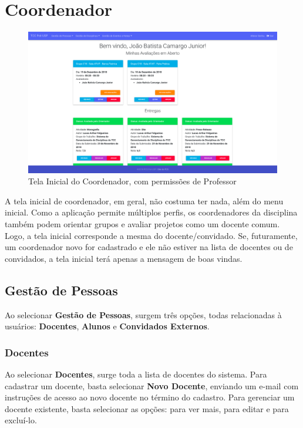 \section{Coordenador}
\begin{figure}[H]
    \centering
    \includegraphics[scale=0.3]{imagens/tela_inicial_coordenador.png}
    \caption{Tela Inicial do Coordenador, com permissões de Professor}
    \label{fig:initial-screen-coordinator}
\end{figure}

A tela inicial de coordenador, em geral, não costuma ter nada, além do menu inicial. Como a aplicação permite múltiplos perfis, os coordenadores da disciplina também podem orientar grupos e avaliar projetos como um docente comum. Logo, a tela inicial corresponde a mesma do docente/convidado. Se, futuramente, um coordenador novo for cadastrado e ele não estiver na lista de docentes ou de convidados, a tela inicial terá apenas a mensagem de boas vindas.

\subsection{Gestão de Pessoas}
Ao selecionar \textbf{Gestão de Pessoas}, surgem três opções, todas relacionadas à usuários: \textbf{Docentes}, \textbf{Alunos} e \textbf{Convidados Externos}.

\subsubsection{Docentes}
Ao selecionar \textbf{Docentes}, surge toda a lista de docentes do sistema. Para cadastrar um docente, basta selecionar \textbf{Novo Docente}, enviando um e-mail com instruções de acesso ao novo docente no término do cadastro. Para gerenciar um docente existente, basta selecionar as opções: \faEye para ver mais, \faEdit para editar e \faTrash para excluí-lo.


